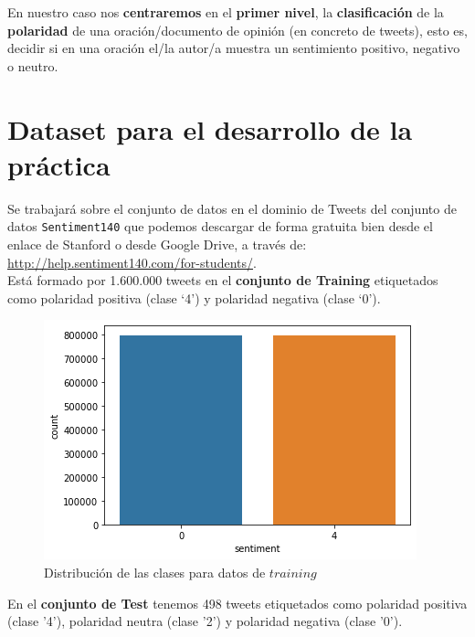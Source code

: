 \documentclass[a4paper,12pt]{report}
\begin{document}
{\setlength{\parindent}{0cm}
En nuestro caso nos \textbf{centraremos} en el \textbf{primer nivel},  la \textbf{clasificación} de la \textbf{polaridad} de una oración/documento de opinión (en concreto de tweets), esto es, decidir si en una oración el/la autor/a muestra un sentimiento positivo, negativo o neutro.}

\section{Dataset para el desarrollo de la práctica}

{\setlength{\parindent}{0cm}
Se trabajará sobre el conjunto de datos en el dominio de Tweets del conjunto de datos \texttt{Sentiment140} que podemos descargar de forma gratuita bien desde el enlace de Stanford o desde Google Drive, a través de: \url{http://help.sentiment140.com/for-students/}. }
\vspace{2mm}\\
Está formado por 1.600.000 tweets en el \textbf{conjunto de Training} etiquetados como polaridad positiva (clase ‘4’) y polaridad negativa (clase ‘0’). 

\begin{figure}[htbp!]
\begin{center}
\includegraphics[scale=0.55]{images/train.png}
\end{center}
\caption{Distribución de las clases para datos de $training$}
\end{figure}

\vspace{2mm}
{\setlength{\parindent}{0cm}
En el \textbf{conjunto de Test} tenemos 498 tweets etiquetados como polaridad positiva (clase '4'), polaridad neutra (clase '2') y polaridad negativa (clase '0').}
\end{document}
